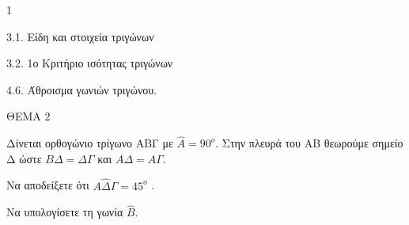 \begin{ylh}{1}
    \item 3.1. Είδη και στοιχεία τριγώνων
    \item 3.2. 1ο Κριτήριο ισότητας τριγώνων
    \item 4.6. Άθροισμα γωνιών τριγώνου.
\end{ylh}

ΘΕΜΑ 2

Δίνεται ορθογώνιο τρίγωνο ΑΒΓ με $\widehat{Α} = 90^{ο}$. Στην πλευρά του ΑΒ θεωρούμε σημείο Δ ώστε $Β\Delta = \Delta\Gamma$ και $Α\Delta = Α\Gamma$.

\begin{alist}
\item Να αποδείξετε ότι $Α\widehat{\Delta}\Gamma = 45^{ο}$ . 

\item Να υπολογίσετε τη γωνία $\widehat{Β}$. 


\begin{center}
\end{center}
\end{alist}
